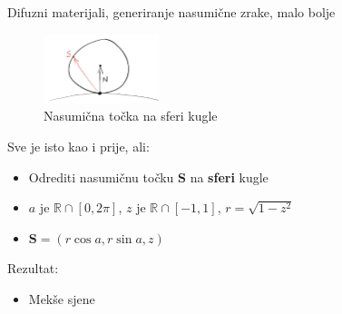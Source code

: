 \documentclass[9pt]{beamer}
\begin{document}
\begin{frame}{Difuzni materijali, generiranje nasumične zrake, malo bolje}
\begin{figure}
	\includegraphics[width=0.3\textwidth]{./slike/rand-unitvector.png}
	\caption{Nasumična točka na sferi kugle}
\end{figure}
Sve je isto kao i prije, ali:
\begin{itemize}
	\item Odrediti nasumičnu točku $\mathbf{S}$ na \textbf{sferi} kugle
	\item $a$ je $\mathbb{R} \cap \left[0, 2\pi\right]$, $z$ je $\mathbb{R} \cap \left[-1, 1\right]$, $r = \sqrt{1-z^2}$
	\item $\mathbf{S} = (r\cos a, r\sin a, z)$
\end{itemize}
Rezultat:
\begin{itemize}
	\item Mekše sjene  
\end{itemize}
\end{frame}
\end{document}
